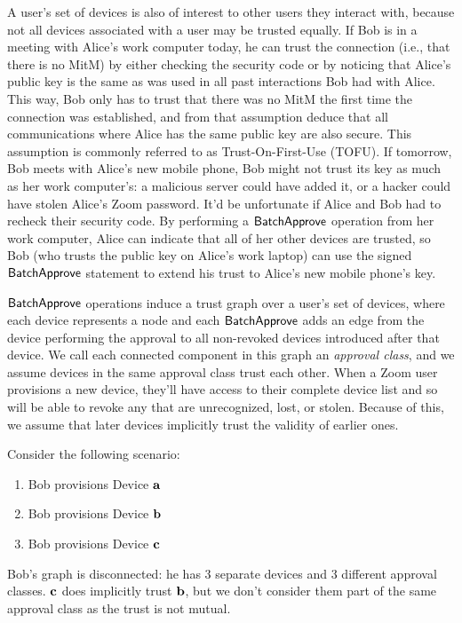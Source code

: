 A user's set of devices is also of interest to other users they interact with, because not all
devices associated with a user may be trusted equally. If Bob is in a meeting with Alice's work
computer today, he can trust the connection (i.e., that there is no MitM) by either checking the
security code or by noticing that Alice's public key is the same as was used in all past
interactions Bob had with Alice. This way, Bob only has to trust that there was no MitM the first
time the connection was established, and from that assumption deduce that all communications where
Alice has the same public key are also secure. This assumption is commonly referred to as
Trust-On-First-Use (TOFU). If tomorrow, Bob meets with Alice's new mobile phone, Bob might not trust
its key as much as her work computer's: a malicious server could have added it, or a hacker could
have stolen Alice's Zoom password. It'd be unfortunate if Alice and Bob had to recheck their
security code. By performing a $\mathsf{BatchApprove}{}$ operation from her work computer, Alice can
indicate that all of her other devices are trusted, so Bob (who trusts the public key on Alice's
work laptop) can use the signed $\mathsf{BatchApprove}{}$ statement to extend his trust to Alice's new
mobile phone's key.

$\mathsf{BatchApprove}{}$ operations induce a trust graph over a user's set of devices, where each device
represents a node and each $\mathsf{BatchApprove}{}$ adds an edge from the device performing the approval to
all non-revoked devices introduced after that device. We call each connected component in this graph
an \textit{approval class}, and we assume devices in the same approval class trust each other. When
a Zoom user provisions a new device, they'll have access to their complete device list and so will
be able to revoke any that are unrecognized, lost, or stolen. Because of this, we assume that later
devices implicitly trust the validity of earlier ones.

Consider the following scenario:
\begin{enumerate}
\item Bob provisions Device $\mathbf{a}$
\item Bob provisions Device $\mathbf{b}$
\item Bob provisions Device $\mathbf{c}$
\end{enumerate}

Bob's graph is disconnected: he has 3 separate devices and 3 different approval classes. $\mathbf{c}$
does implicitly trust $\mathbf{b}$, but we don't consider them part of the same approval class as the
trust is not mutual.

